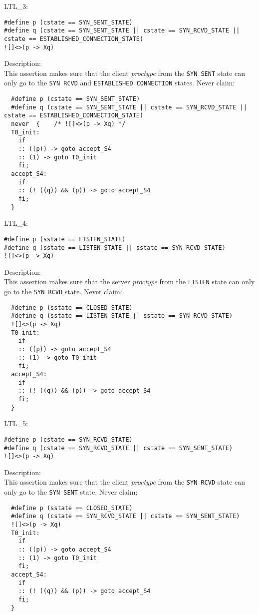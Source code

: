 \documentclass{WigReport}
\begin{document}
LTL\_3:\\
\begin{lstlisting}
#define p (cstate == SYN_SENT_STATE)
#define q (cstate == SYN_SENT_STATE || cstate == SYN_RCVD_STATE || cstate == ESTABLISHED_CONNECTION_STATE)
![]<>(p -> Xq)
\end{lstlisting}
Description:\\
This assertion makes sure that the client \textit{proctype} from the \verb|SYN SENT| state can only go to the \verb|SYN RCVD| and \verb|ESTABLISHED CONNECTION| states.
Never claim:\\
\begin{lstlisting}
  #define p (cstate == SYN_SENT_STATE)
  #define q (cstate == SYN_SENT_STATE || cstate == SYN_RCVD_STATE || cstate == ESTABLISHED_CONNECTION_STATE)
  never  {    /* ![]<>(p -> Xq) */
  T0_init:
    if
    :: ((p)) -> goto accept_S4
    :: (1) -> goto T0_init
    fi;
  accept_S4:
    if
    :: (! ((q)) && (p)) -> goto accept_S4
    fi;
  }
\end{lstlisting}


LTL\_4:\\
\begin{lstlisting}
#define p (sstate == LISTEN_STATE)
#define q (sstate == LISTEN_STATE || sstate == SYN_RCVD_STATE)
![]<>(p -> Xq)
\end{lstlisting}
Description:\\
This assertion makes sure that the server \textit{proctype} from the \verb|LISTEN| state can only go to the \verb|SYN RCVD| state.
Never claim:\\
\begin{lstlisting}
  #define p (sstate == CLOSED_STATE)
  #define q (sstate == LISTEN_STATE || sstate == SYN_RCVD_STATE)
  ![]<>(p -> Xq)
  T0_init:
    if
    :: ((p)) -> goto accept_S4
    :: (1) -> goto T0_init
    fi;
  accept_S4:
    if
    :: (! ((q)) && (p)) -> goto accept_S4
    fi;
  }
\end{lstlisting}


LTL\_5:\\
\begin{lstlisting}
#define p (cstate == SYN_RCVD_STATE)
#define q (cstate == SYN_RCVD_STATE || cstate == SYN_SENT_STATE)
![]<>(p -> Xq)
\end{lstlisting}
Description:\\
This assertion makes sure that the client \textit{proctype} from the \verb|SYN RCVD| state can only go to the \verb|SYN SENT| state.
Never claim:\\
\begin{lstlisting}
  #define p (sstate == CLOSED_STATE)
  #define q (cstate == SYN_RCVD_STATE || cstate == SYN_SENT_STATE)
  ![]<>(p -> Xq)
  T0_init:
    if
    :: ((p)) -> goto accept_S4
    :: (1) -> goto T0_init
    fi;
  accept_S4:
    if
    :: (! ((q)) && (p)) -> goto accept_S4
    fi;
  }
\end{lstlisting}
\end{document}
